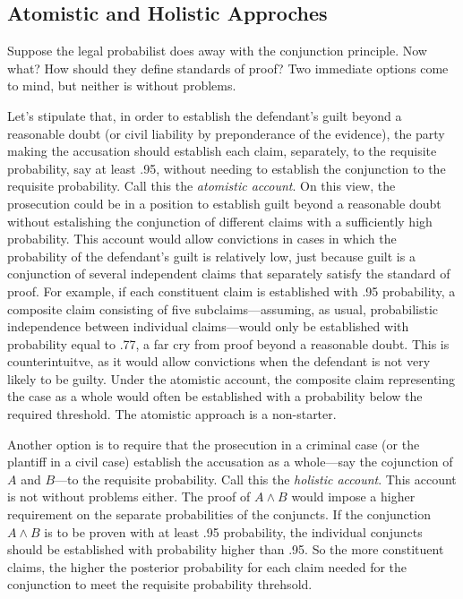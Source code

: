 \documentclass[
  10pt,
  dvipsnames,enabledeprecatedfontcommands]{scrartcl}
\newcommand{\et}{\wedge}
\begin{document}

\noindent

\hypertarget{atomistic-and-holistic-approches}{%
\subsection{Atomistic and Holistic
Approches}\label{atomistic-and-holistic-approches}}

Suppose the legal probabilist does away with the conjunction principle.
Now what? How should they define standards of proof? Two immediate
options come to mind, but neither is without problems.

Let's stipulate that, in order to establish the defendant's guilt beyond
a reasonable doubt (or civil liability by preponderance of the
evidence), the party making the accusation should establish each claim,
separately, to the requisite probability, say at least .95, without
needing to establish the conjunction to the requisite probability. Call
this the \textit{atomistic account}. On this view, the prosecution could
be in a position to establish guilt beyond a reasonable doubt without
estalishing the conjunction of different claims with a sufficiently high
probability. This account would allow convictions in cases in which the
probability of the defendant's guilt is relatively low, just because
guilt is a conjunction of several independent claims that separately
satisfy the standard of proof. For example, if each constituent claim is
established with .95 probability, a composite claim consisting of five
subclaims---assuming, as usual, probabilistic independence between
individual claims---would only be established with probability equal to
.77, a far cry from proof beyond a reasonable doubt. This is
counterintuitve, as it would allow convictions when the defendant is not
very likely to be guilty. Under the atomistic account, the composite
claim representing the case as a whole would often be established with a
probability below the required threshold. The atomistic approach is a
non-starter.

Another option is to require that the prosecution in a criminal case (or
the plantiff in a civil case) establish the accusation as a whole---say
the cojunction of \(A\) and \(B\)---to the requisite probability. Call
this the \textit{holistic account}. This account is not without problems
either. The proof of \(A\et B\) would impose a higher requirement on the
separate probabilities of the conjuncts. If the conjunction \(A\et B\)
is to be proven with at least .95 probability, the individual conjuncts
should be established with probability higher than .95. So the more
constituent claims, the higher the posterior probability for each claim
needed for the conjunction to meet the requisite probability threhsold.
\end{document}

